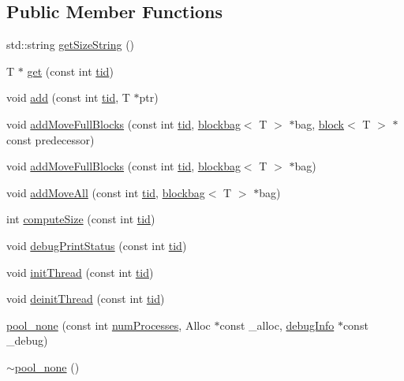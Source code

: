 \subsection*{Public Member Functions}
\begin{DoxyCompactItemize}
\item 
std\+::string \hyperlink{classpool__none_abe3bc246d2d7a2c7e118f3da40a14501}{get\+Size\+String} ()
\item 
T $\ast$ \hyperlink{classpool__none_a5cfa4676cbf37a0224224256ab365840}{get} (const int \hyperlink{microbench_2main_8cpp_a9ca9869868fe7e7a38a921cc7de4103f}{tid})
\item 
void \hyperlink{classpool__none_a07c69ce30c2cb27f3ca8e36b3b4c30bb}{add} (const int \hyperlink{microbench_2main_8cpp_a9ca9869868fe7e7a38a921cc7de4103f}{tid}, T $\ast$ptr)
\item 
void \hyperlink{classpool__none_a1970af5c93f95a63b0aaf6a85cf68f11}{add\+Move\+Full\+Blocks} (const int \hyperlink{microbench_2main_8cpp_a9ca9869868fe7e7a38a921cc7de4103f}{tid}, \hyperlink{classblockbag}{blockbag}$<$ T $>$ $\ast$bag, \hyperlink{classblock}{block}$<$ T $>$ $\ast$const predecessor)
\item 
void \hyperlink{classpool__none_a0769e6af03c60e9148ccf91a2b034bbe}{add\+Move\+Full\+Blocks} (const int \hyperlink{microbench_2main_8cpp_a9ca9869868fe7e7a38a921cc7de4103f}{tid}, \hyperlink{classblockbag}{blockbag}$<$ T $>$ $\ast$bag)
\item 
void \hyperlink{classpool__none_a4d773f878fb8e0c11c70b49c73ef24b6}{add\+Move\+All} (const int \hyperlink{microbench_2main_8cpp_a9ca9869868fe7e7a38a921cc7de4103f}{tid}, \hyperlink{classblockbag}{blockbag}$<$ T $>$ $\ast$bag)
\item 
int \hyperlink{classpool__none_a7c1e31b11de7a07d4bdb950ba5aa5508}{compute\+Size} (const int \hyperlink{microbench_2main_8cpp_a9ca9869868fe7e7a38a921cc7de4103f}{tid})
\item 
void \hyperlink{classpool__none_ad2f9a5fa2c6bb00e00b769681476a084}{debug\+Print\+Status} (const int \hyperlink{microbench_2main_8cpp_a9ca9869868fe7e7a38a921cc7de4103f}{tid})
\item 
void \hyperlink{classpool__none_a60aa791c93ff63d74dc1e247aa56683d}{init\+Thread} (const int \hyperlink{microbench_2main_8cpp_a9ca9869868fe7e7a38a921cc7de4103f}{tid})
\item 
void \hyperlink{classpool__none_a28f9e8b16ba70d4ed1a9c295bdbc785d}{deinit\+Thread} (const int \hyperlink{microbench_2main_8cpp_a9ca9869868fe7e7a38a921cc7de4103f}{tid})
\item 
\hyperlink{classpool__none_ab79b85eedba6f8cbf97f226cafa87e7a}{pool\+\_\+none} (const int \hyperlink{testing_8cpp_aa085812188e21ede75351d88b9b2c30d}{num\+Processes}, Alloc $\ast$const \+\_\+alloc, \hyperlink{classdebugInfo}{debug\+Info} $\ast$const \+\_\+debug)
\item 
\hyperlink{classpool__none_a5469691d9539271b4fa8d5980e1fcb9e}{$\sim$pool\+\_\+none} ()
\end{DoxyCompactItemize}
